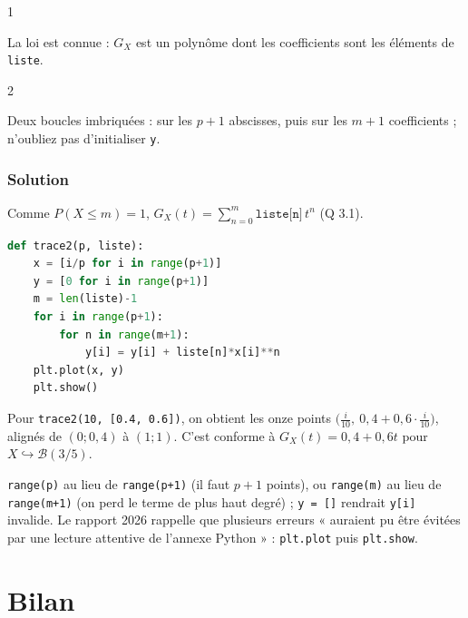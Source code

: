 \documentclass[11pt,a4paper]{article}
\begin{document}
\begin{indication}{1}

La loi est connue : \(G_X\) est un polynôme dont les coefficients sont les éléments de \texttt{liste}.

\end{indication}

\begin{indication}{2}

Deux boucles imbriquées : sur les \(p+1\) abscisses, puis sur les \(m+1\) coefficients ; n'oubliez pas d'initialiser \texttt{y}.

\end{indication}

\hypertarget{solution-80}{%
\subsubsection{Solution}\label{solution-80}}

Comme \(P(X\le m)=1\), \(G_X(t)=\sum_{n=0}^m\texttt{liste[n]}\,t^n\) (Q 3.1).

\begin{lstlisting}[language=Python]
def trace2(p, liste):
    x = [i/p for i in range(p+1)]
    y = [0 for i in range(p+1)]
    m = len(liste)-1
    for i in range(p+1):
        for n in range(m+1):
            y[i] = y[i] + liste[n]*x[i]**n
    plt.plot(x, y)
    plt.show()
\end{lstlisting}

Pour \texttt{trace2(\allowbreak{}10,\allowbreak{}\ {[}0.4,\allowbreak{}\ 0.6{]}\allowbreak{})\allowbreak{}}, on obtient les onze points \(\big(\frac i{10},\ 0{,}4+0{,}6\cdot\frac i{10}\big)\), alignés de \((0;0{,}4)\) à \((1;1)\). C'est conforme à \(G_X(t)=0{,}4+0{,}6t\) pour \(X\hookrightarrow\mathcal B(3/5)\).

\begin{piege}

\texttt{range(p)} au lieu de \texttt{range(p+1)} (il faut \(p+1\) points), ou \texttt{range(m)} au lieu de \texttt{range(m+1)} (on perd le terme de plus haut degré) ; \texttt{y\ =\ {[}{]}} rendrait \texttt{y{[}i{]}} invalide. Le rapport 2026 rappelle que plusieurs erreurs « auraient pu être évitées par une lecture attentive de l'annexe Python » : \texttt{plt.plot} puis \texttt{plt.show}.

\end{piege}

\hypertarget{bilan}{%
\section{Bilan}\label{bilan}}
\end{document}
